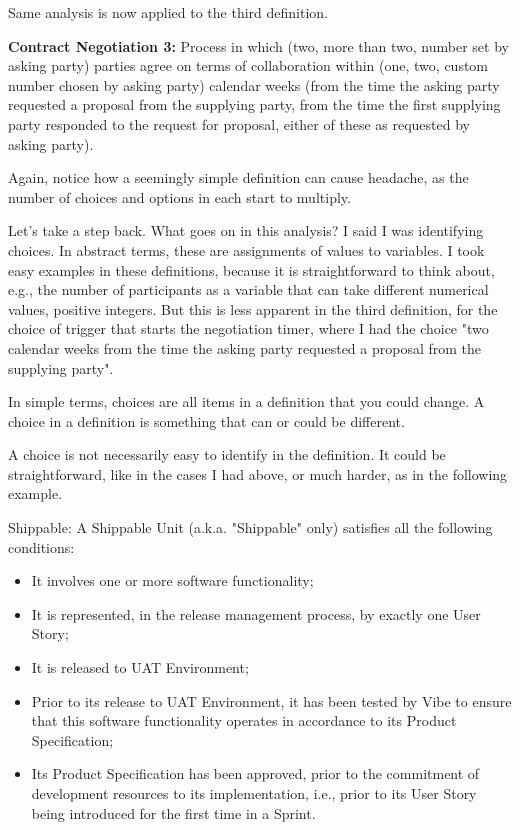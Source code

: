 Same analysis is now applied to the third definition.

\begin{svgraybox}
\textbf{Contract Negotiation 3:} Process in which (two, more than two, number set by asking party) parties agree on terms of collaboration within (one, two, custom number chosen by asking party) calendar weeks (from the time the asking party requested a proposal from the supplying party, from the time the first supplying party responded to the request for proposal, either of these as requested by asking party).
\end{svgraybox}

Again, notice how a seemingly simple definition can cause headache, as the number of choices and options in each start to multiply.

Let's take a step back. What goes on in this analysis? I said I was identifying choices. In abstract terms, these are assignments of values to variables. I took easy examples in these definitions, because it is straightforward to think about, e.g., the number of participants as a variable that can take different numerical values, positive integers. But this is less apparent in the third definition, for the choice of trigger that starts the negotiation timer, where I had the choice "two calendar weeks from the time the asking party requested a proposal from the supplying party".

In simple terms, choices are all items in a definition that you could change. A choice in a definition is something that can or could be different.

A choice is not necessarily easy to identify in the definition. It could be straightforward, like in the cases I had above, or much harder, as in the following example.

\begin{svgraybox}
Shippable: A Shippable Unit (a.k.a. "Shippable" only) satisfies all the following conditions:
\begin{itemize}
	\item It involves one or more software functionality;
	\item It is represented, in the release management process, by exactly one User Story;
	\item It is released to UAT Environment;
	\item Prior to its release to UAT Environment, it has been tested by Vibe to ensure that this software functionality operates in accordance to its Product Specification;
	\item Its Product Specification has been approved, prior to the commitment of development resources to its implementation, i.e., prior to its User Story being introduced for the first time in a Sprint.
\end{itemize}
\end{svgraybox}


